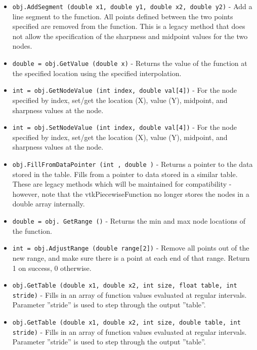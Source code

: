 \begin{itemize}
\item  \verb|obj.AddSegment (double x1, double y1, double x2, double y2)| -  Add a line segment to the function. All points defined between the
 two points specified are removed from the function. This is a legacy
 method that does not allow the specification of the sharpness and
 midpoint values for the two nodes.

\item  \verb|double = obj.GetValue (double x)| -  Returns the value of the function at the specified location using
 the specified interpolation. 

\item  \verb|int = obj.GetNodeValue (int index, double val[4])| -  For the node specified by index, set/get the
 location (X), value (Y), midpoint, and sharpness 
 values at the node.

\item  \verb|int = obj.SetNodeValue (int index, double val[4])| -  For the node specified by index, set/get the
 location (X), value (Y), midpoint, and sharpness 
 values at the node.

\item  \verb|obj.FillFromDataPointer (int , double )| -  Returns a pointer to the data stored in the table.
 Fills from a pointer to data stored in a similar table. These are
 legacy methods which will be maintained for compatibility - however,
 note that the vtkPiecewiseFunction no longer stores the nodes 
 in a double array internally.

\item  \verb|double = obj. GetRange ()| -  Returns the min and max node locations of the function.

\item  \verb|int = obj.AdjustRange (double range[2])| -  Remove all points out of the new range, and make sure there is a point
 at each end of that range.
 Return 1 on success, 0 otherwise.

\item  \verb|obj.GetTable (double x1, double x2, int size, float table, int stride)| -  Fills in an array of function values evaluated at regular intervals.
 Parameter ''stride'' is used to step through the output ''table''. 

\item  \verb|obj.GetTable (double x1, double x2, int size, double table, int stride)| -  Fills in an array of function values evaluated at regular intervals.
 Parameter ''stride'' is used to step through the output ''table''. 


\end{itemize}
